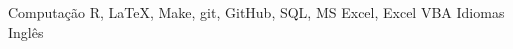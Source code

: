 \begin{cvskills}
  \cvskill
    {Computação}
    {R, LaTeX, Make, git, GitHub, SQL, MS Excel, Excel VBA}
  \cvskill
    {Idiomas}
    {Inglês}
\end{cvskills}
